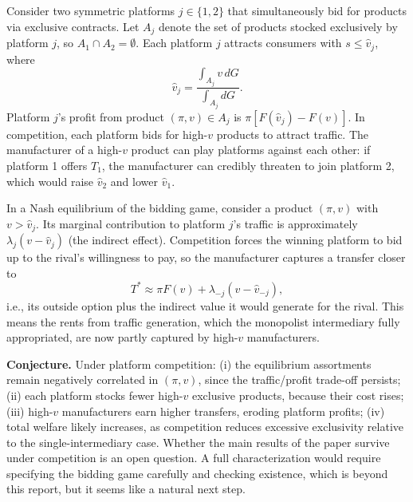 \documentclass[11pt]{article}
\begin{document}
Consider two symmetric platforms $j \in \{1, 2\}$ that simultaneously bid for products via exclusive contracts. Let $A_j$ denote the set of products stocked exclusively by platform $j$, so $A_1 \cap A_2 = \emptyset$. Each platform $j$ attracts consumers with $s \leq \hat{v}_j$, where
\[
\hat{v}_j = \frac{\int_{A_j} v\, dG}{\int_{A_j} dG}.
\]
Platform $j$'s profit from product $(\pi, v) \in A_j$ is $\pi[F(\hat{v}_j) - F(v)]$. In competition, each platform bids for high-$v$ products to attract traffic. The manufacturer of a high-$v$ product can play platforms against each other: if platform 1 offers $T_1$, the manufacturer can credibly threaten to join platform 2, which would raise $\hat{v}_2$ and lower $\hat{v}_1$.

In a Nash equilibrium of the bidding game, consider a product $(\pi, v)$ with $v > \hat{v}_j$. Its marginal contribution to platform $j$'s traffic is approximately $\lambda_j (v - \hat{v}_j)$ (the indirect effect). Competition forces the winning platform to bid up to the rival's willingness to pay, so the manufacturer captures a transfer closer to
\[
T^* \approx \pi F(v) + \lambda_{-j}(v - \hat{v}_{-j}),
\]
i.e., its outside option plus the indirect value it would generate for the rival. This means the rents from traffic generation, which the monopolist intermediary fully appropriated, are now partly captured by high-$v$ manufacturers.

\textbf{Conjecture.} Under platform competition: (i) the equilibrium assortments remain negatively correlated in $(\pi, v)$, since the traffic/profit trade-off persists; (ii) each platform stocks fewer high-$v$ exclusive products, because their cost rises; (iii) high-$v$ manufacturers earn higher transfers, eroding platform profits; (iv) total welfare likely increases, as competition reduces excessive exclusivity relative to the single-intermediary case. Whether the main results of the paper survive under competition is an open question. A full characterization would require specifying the bidding game carefully and checking existence, which is beyond this report, but it seems like a natural next step.
\end{document}
